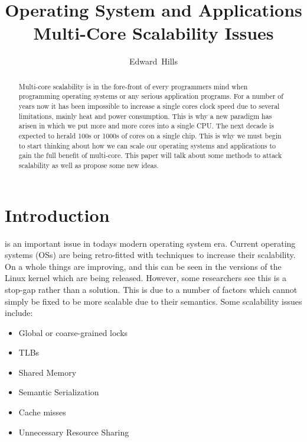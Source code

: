 \documentclass[journal]{IEEEtran}
\begin{document}
\title{Operating System and Applications Multi-Core Scalability Issues}

\author{Edward~Hills}

\maketitle

\begin{abstract}

Multi-core scalability is in the fore-front of every programmers mind when programming operating systems or any serious application programs. For a number of years now it has been impossible to increase a single cores clock speed due to several limitations, mainly heat and power consumption. This is why a new paradigm has arisen in which we put more and more cores into a single CPU. The next decade is expected to herald 100s or 1000s of cores on a single chip. This is why we must begin to start thinking about how we can scale our operating systems and applications to gain the full benefit of multi-core. This paper will talk about some methods to attack scalability as well as propose some new ideas.

\end{abstract}

\section{Introduction}
 is an important issue in todays modern operating system era. Current operating systems (OSs) are being retro-fitted with techniques to increase their scalability. On a whole things are improving, and this can be seen in the versions of the Linux kernel which are being released. However, some researchers see this is a stop-gap rather than a solution. This is due to a number of factors which cannot simply be fixed to be more scalable due to their semantics. Some scalability issues include:

\vspace{2mm}

\begin{itemize}
\item Global or coarse-grained locks
\item TLBs
\item Shared Memory
\item Semantic Serialization
\item Cache misses
\item Unnecessary Resource Sharing
\end{itemize}
\end{document}
